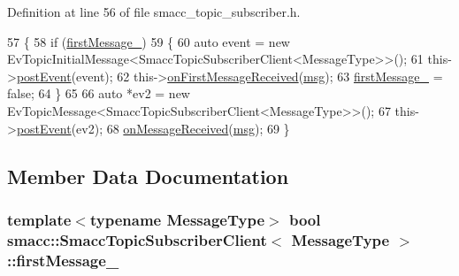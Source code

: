 Definition at line 56 of file smacc\+\_\+topic\+\_\+subscriber.\+h.


\begin{DoxyCode}
57   \{
58     \textcolor{keywordflow}{if} (\hyperlink{classsmacc_1_1SmaccTopicSubscriberClient_a82a44f35d08659bba1e642650296dc5d}{firstMessage\_})
59     \{
60       \textcolor{keyword}{auto} \textcolor{keyword}{event} = \textcolor{keyword}{new} EvTopicInitialMessage<SmaccTopicSubscriberClient<MessageType>>();
61       this->\hyperlink{classsmacc_1_1ISmaccComponent_a687dead5b87a3b9781b9bf6ab0b7afa5}{postEvent}(event);
62       this->\hyperlink{classsmacc_1_1SmaccTopicSubscriberClient_ac18bfc587bbaad6b150ce4bf9cdb56ed}{onFirstMessageReceived}(\hyperlink{namespacekeyboard__node_a768777e12f75b89e4a0a60acf748e9eb}{msg});
63       \hyperlink{classsmacc_1_1SmaccTopicSubscriberClient_a82a44f35d08659bba1e642650296dc5d}{firstMessage\_} = \textcolor{keyword}{false};
64     \}
65 
66     \textcolor{keyword}{auto} *ev2 = \textcolor{keyword}{new} EvTopicMessage<SmaccTopicSubscriberClient<MessageType>>();
67     this->\hyperlink{classsmacc_1_1ISmaccComponent_a687dead5b87a3b9781b9bf6ab0b7afa5}{postEvent}(ev2);
68     \hyperlink{classsmacc_1_1SmaccTopicSubscriberClient_a4260d955152200804e9c51a1098965c8}{onMessageReceived}(\hyperlink{namespacekeyboard__node_a768777e12f75b89e4a0a60acf748e9eb}{msg});
69   \}
\end{DoxyCode}


\subsection{Member Data Documentation}
\subsubsection[{\texorpdfstring{first\+Message\+\_\+}{firstMessage_}}]{\setlength{\rightskip}{0pt plus 5cm}template$<$typename Message\+Type$>$ {\bf bool} {\bf smacc\+::\+Smacc\+Topic\+Subscriber\+Client}$<$ Message\+Type $>$\+::first\+Message\+\_\+\hspace{0.3cm}{\ttfamily [private]}}\hypertarget{classsmacc_1_1SmaccTopicSubscriberClient_a82a44f35d08659bba1e642650296dc5d}{}\label{classsmacc_1_1SmaccTopicSubscriberClient_a82a44f35d08659bba1e642650296dc5d}


